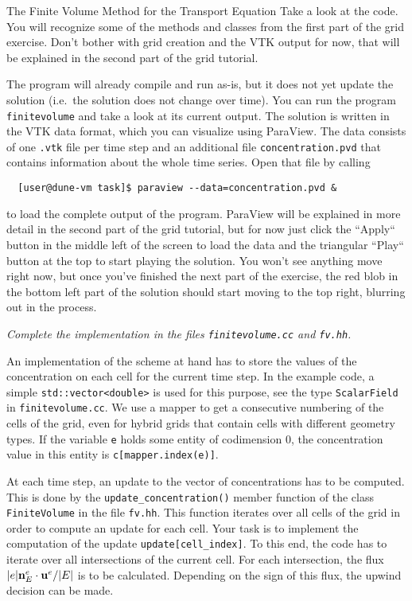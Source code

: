 \documentclass[12pt,a4paper]{article}
\newcommand{\uu}{\textbf u}
\newcommand{\nn}{\textbf n}
\begin{document}
\begin{Exercise}{The Finite Volume Method for the Transport Equation}
  Take a look at the code. You will recognize some of the methods and classes
  from the first part of the grid exercise. Don't bother with grid creation and
  the VTK output for now, that will be explained in the second part of the grid
  tutorial.

  The program will already compile and run as-is, but it does not yet update
  the solution (i.e.~the solution does not change over time). You can run the
  program \lstinline!finitevolume! and take a look at its current output. The
  solution is written in the VTK data format, which you can visualize using
  ParaView. The data consists of one \lstinline!.vtk! file per time step and
  an additional file \lstinline!concentration.pvd! that contains information
  about the whole time series. Open that file by calling
\begin{lstlisting}
  [user@dune-vm task]$ paraview --data=concentration.pvd &
\end{lstlisting}
  to load the complete output of the program. ParaView will be explained in more
  detail in the second part of the grid tutorial, but for now just click the
  ``Apply`` button in the middle left of the screen to load the data and the
  triangular ``Play`` button at the top to start playing the solution. You won't
  see anything move right now, but once you've finished the next part of the
  exercise, the red blob in the bottom left part of the solution should start
  moving to the top right, blurring out in the process.

 \emph{Complete the implementation in the files \texttt{finitevolume.cc} and \texttt{fv.hh}.}

  An implementation of the scheme at hand has to store the values of
  the concentration on each cell for the current time step.  In the
  example code, a simple \texttt{std::vector<double>} is used for this
  purpose, see the type \texttt{ScalarField} in
  \texttt{finitevolume.cc}.  We use a mapper to get a consecutive
  numbering of the cells of the grid, even for hybrid grids that contain
  cells with different geometry types.  If the variable \texttt{e}
  holds some entity of codimension 0, the concentration value in this
  entity is \texttt{c[mapper.index(e)]}.

  At each time step, an update to the vector of concentrations has to
  be computed.  This is done by the \texttt{update\_concentration()} member function
  of the class \texttt{FiniteVolume} in the file \texttt{fv.hh}.  This
  function iterates over all cells of the grid in order to compute an
  update for each cell.  Your task is to implement the computation of
  the update \texttt{update[cell\_index]}.  To this end, the code has to
  iterate over all intersections of the current cell.  For each
  intersection, the flux $|e|\nn_E^e\cdot\uu^e/|E|$ is to be
  calculated.  Depending on the sign of this flux, the upwind decision
  can be made.


\end{Exercise}
\end{document}
